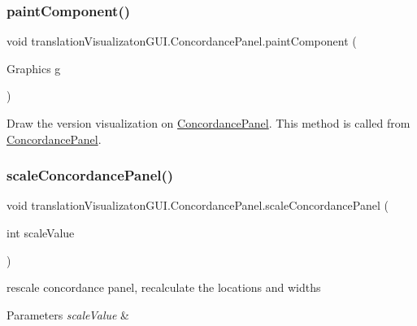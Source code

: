 \subsubsection{\texorpdfstring{paint\+Component()}{paintComponent()}}
{\footnotesize\ttfamily void translation\+Visualizaton\+G\+U\+I.\+Concordance\+Panel.\+paint\+Component (\begin{DoxyParamCaption}\item[{Graphics}]{g }\end{DoxyParamCaption})\hspace{0.3cm}{\ttfamily [inline]}}

Draw the version visualization on \hyperlink{classtranslation_visualizaton_g_u_i_1_1_concordance_panel}{Concordance\+Panel}. This method is called from \hyperlink{classtranslation_visualizaton_g_u_i_1_1_concordance_panel}{Concordance\+Panel}. \mbox{\label{classtranslation_visualizaton_g_u_i_1_1_concordance_panel_ae6d25eb2cfc8138b251aef627c5b488c}} 
\subsubsection{\texorpdfstring{scale\+Concordance\+Panel()}{scaleConcordancePanel()}}
{\footnotesize\ttfamily void translation\+Visualizaton\+G\+U\+I.\+Concordance\+Panel.\+scale\+Concordance\+Panel (\begin{DoxyParamCaption}\item[{int}]{scale\+Value }\end{DoxyParamCaption})\hspace{0.3cm}{\ttfamily [inline]}}

rescale concordance panel, recalculate the locations and widths 
\begin{DoxyParams}{Parameters}
{\em scale\+Value} & \\
\hline
\end{DoxyParams}
\mbox{\label{classtranslation_visualizaton_g_u_i_1_1_concordance_panel_a09b316adf18485d4f1c53e86b46eb780}} 

